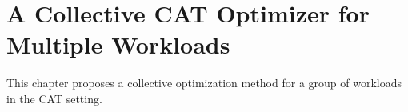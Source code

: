 \chapter{A Collective CAT Optimizer for Multiple Workloads}
\label{chapter:micky}

This chapter proposes a collective optimization method
for a group of workloads in the CAT setting.






%

